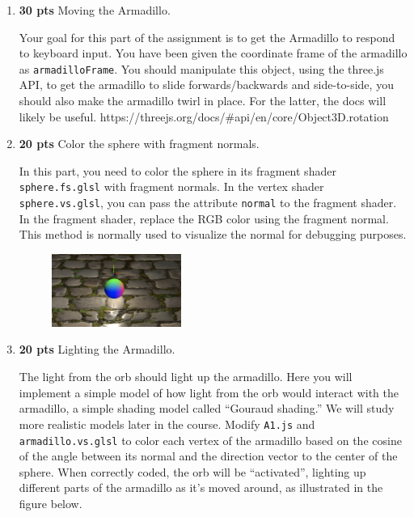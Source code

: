 \documentclass[12pt]{exam}
\begin{document}
\renewcommand{\labelenumi}{(\alph{enumi})}
\begin{enumerate}

\item {\bf 30 pts} Moving the Armadillo.

  Your goal for this part of the assignment is to get the Armadillo to respond to keyboard input. You have been given the coordinate frame of the armadillo as {\tt armadilloFrame}. You should manipulate this object, using the three.js API, to get the armadillo to slide forwards/backwards and side-to-side, you should also make the armadillo twirl in place. For the latter, the docs will likely be useful. \newline
  https://threejs.org/docs/\#api/en/core/Object3D.rotation
  
 \item {\bf 20 pts} Color the sphere with fragment normals.
 
 In this part, you need to color the sphere in its fragment shader {\tt sphere.fs.glsl} with fragment normals. In the vertex shader {\tt sphere.vs.glsl}, you can pass the attribute {\tt normal} to the fragment shader.  In the fragment shader, replace the RGB color using the fragment normal. This method is normally used to visualize the normal for debugging purposes.

 \begin{figure}[H]
  \centering
  \includegraphics[width=0.4\textwidth]{./sphere.png}
\end{figure}

 \item {\bf 20 pts} Lighting the Armadillo.

  The light from the orb should light up the armadillo. Here you will
  implement a simple model of how light from the orb would interact
  with the armadillo, a simple shading model called ``Gouraud
  shading.''  We will study more realistic models later in the
  course. Modify {\tt A1.js} and {\tt armadillo.vs.glsl} to color each
  vertex of the armadillo based on the cosine of the angle between its
  normal and the direction vector to the center of the sphere. When
  correctly coded, the orb will be ``activated'', lighting up
  different parts of the armadillo as it's moved around, as
  illustrated in the figure below.


\end{enumerate}
\end{document}
